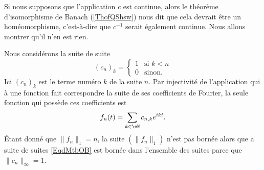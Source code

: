 Si nous supposons que l'application \( c\) est continue, alors le théorème d'isomorphisme de Banach (\ref{ThofQShsw}) nous dit que cela devrait être un homéomorphisme, c'est-à-dire que \( c^{-1}\) serait également continue. Nous allons montrer qu'il n'en est rien.

Nous considérons la suite de suite
\begin{equation}    \label{EqdMtbOB}
    (c_n)_k=\begin{cases}
        1    &   \text{si } k<n\\
        0    &    \text{sinon}.
    \end{cases}
\end{equation}
Ici \( (c_n)_k\) est le terme numéro \( k\) de la suite \( n\). Par injectivité de l'application qui à une fonction fait correspondre la suite de ses coefficients de Fourier, la seule fonction qui possède ces coefficients est
\begin{equation}
    f_n(t)=\sum_{k\in \eN}c_{n,k} e^{ikt}.
\end{equation}
Étant donné que \( \| f_n \|_1=n\), la suite \( (\| f_n \|_1)\) n'est pas bornée alors que a suite de suites \eqref{EqdMtbOB} est bornée dans l'ensemble des suites parce que \( \| c_n \|_{\infty}=1\).
